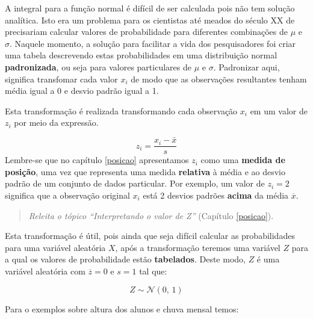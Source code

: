 \documentclass[
]{book}
\begin{document}
A integral para a função normal é difícil de ser calculada pois não tem solução analítica. Isto era um problema para os cientistas até meados do século XX de precisariam calcular valores de probabilidade para diferentes combinações de \(\mu\) e \(\sigma\). Naquele momento, a solução para facilitar a vida dos pesquisadores foi criar uma tabela descrevendo estas probabilidades em uma distribuição normal \textbf{padronizada}, ou seja para valores particulares de \(\mu\) e \(\sigma\). Padronizar aqui, significa transfomar cada valor \(x_i\) de modo que as observações resultantes tenham média igual a 0 e desvio padrão igual a 1.

Esta transformação é realizada transformando cada observação \(x_i\) em um valor de \(z_i\) por meio da expressão.

\[z_i = \frac{x_i - \bar{x}}{s}\]
Lembre-se que no capítulo \ref{posicao} apresentamos \(z_i\) como uma \textbf{medida de posição}, uma vez que representa uma medida \textbf{relativa} à média e ao desvio padrão de um conjunto de dados particular. Por exemplo, um valor de \(z_i = 2\) significa que a observação original \(x_i\) está 2 desvios padrões \textbf{acima} da média \(\overline{x}\).

\begin{quote}
\emph{Releita o tópico ``Interpretando o valor de Z''} (Capítulo \ref{posicao}).
\end{quote}

Esta transformação é útil, pois ainda que seja difícil calcular as probabilidades para uma variável aleatória \(X\), após a transformação teremos uma variável \(Z\) para a qual os valores de probabilidade estão \textbf{tabelados}. Deste modo, \(Z\) é uma variável aleatória com \(\overline{z} = 0\) e \(s = 1\) tal que:

\[Z \sim \mathcal{N}(0,\,1)\]

Para o exemplos sobre altura dos alunos e chuva mensal temos:
\end{document}
